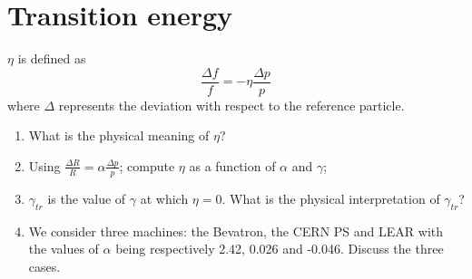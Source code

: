 \documentclass[12pt]{article}
\begin{document}
\section{Transition energy}
\label{problem3}
$\eta$ is defined as
\begin{equation}
\frac{\Delta f}{f}= - \eta \frac{\Delta p}{p}
\end{equation}
where $\Delta$ represents the deviation with respect to the reference particle.
\begin{enumerate}
\item What is the physical meaning of $\eta$?
\item Using $\frac{\Delta R}{R} = \alpha \frac{\Delta p}{p}$; compute $\eta$ as a function of $\alpha$ and $\gamma$;
\item $\gamma_{tr}$ is the value of $\gamma$ at which $\eta =0$. What is the physical interpretation of $\gamma_{tr}$?
\item We consider three machines: the Bevatron, the CERN PS and LEAR with the values of $\alpha$ being respectively 2.42, 0.026 and -0.046. Discuss the three cases.
\end{enumerate}
\end{document}
